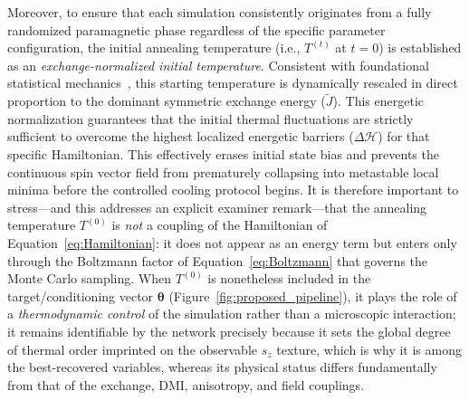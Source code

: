 \documentclass[letterpaper, 12, one column]{article}
\newcommand{\jc}[1]{\textcolor[rgb]{0.00,0.0,1.00}{#1}}
\begin{document}
Moreover, to ensure that each simulation consistently originates from a fully randomized paramagnetic phase regardless of the specific parameter configuration, the initial annealing temperature (i.e., $T^{(t)}$ at $t=0$) is established as an \textit{exchange-normalized initial temperature}. Consistent with foundational statistical mechanics~\cite{eriksson2017atomistic}, this starting temperature is dynamically rescaled in direct proportion to the dominant symmetric exchange energy ($\tilde{J}$). This energetic normalization guarantees that the initial thermal fluctuations are strictly sufficient to overcome the highest localized energetic barriers ($\Delta \mathcal{H}$) for that specific Hamiltonian. This effectively erases initial state bias and prevents the continuous spin vector field from prematurely collapsing into metastable local minima before the controlled cooling protocol begins. \jc{It is therefore important to stress---and this addresses an explicit examiner remark---that the annealing temperature $T^{(0)}$ is \emph{not} a coupling of the Hamiltonian of Equation~\ref{eq:Hamiltonian}: it does not appear as an energy term but enters only through the Boltzmann factor of Equation~\ref{eq:Boltzmann} that governs the Monte Carlo sampling. When $T^{(0)}$ is nonetheless included in the target/conditioning vector $\boldsymbol{\theta}$ (Figure~\ref{fig:proposed_pipeline}), it plays the role of a \emph{thermodynamic control} of the simulation rather than a microscopic interaction; it remains identifiable by the network precisely because it sets the global degree of thermal order imprinted on the observable $s_z$ texture, which is why it is among the best-recovered variables, whereas its physical status differs fundamentally from that of the exchange, DMI, anisotropy, and field couplings.}
\end{document}
